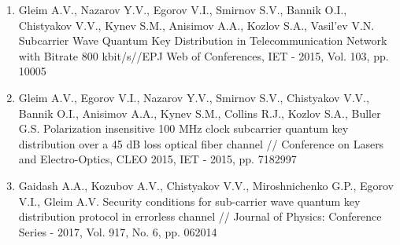 {\begin{refsection}
\begin{enumerate}
\item    Gleim A.V., Nazarov Y.V., Egorov V.I., Smirnov S.V., Bannik O.I., Chistyakov V.V., Kynev S.M., Anisimov A.A., Kozlov S.A., Vasil'ev V.N. Subcarrier Wave Quantum Key Distribution in Telecommunication Network with Bitrate 800 kbit/s//EPJ Web of Conferences, IET - 2015, Vol. 103, pp. 10005
\\
\item    Gleim A.V., Egorov V.I., Nazarov Y.V., Smirnov S.V., Chistyakov V.V., Bannik O.I., Anisimov A.A., Kynev S.M., Collins R.J., Kozlov S.A., Buller G.S. Polarization insensitive 100 MHz clock subcarrier quantum key distribution over a 45 dB loss optical fiber channel // Conference on Lasers and Electro-Optics, CLEO 2015, IET - 2015, pp. 7182997
\\
\item Gaidash A.A., Kozubov A.V., Chistyakov V.V., Miroshnichenko G.P., Egorov V.I., Gleim A.V. Security conditions for sub-carrier wave quantum key distribution protocol in errorless channel // Journal of Physics: Conference Series - 2017, Vol. 917, No. 6, pp. 062014
\\
\\


\end{enumerate}
\end{refsection}}
